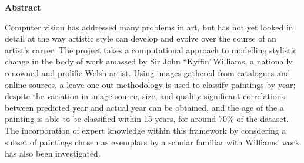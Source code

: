\thispagestyle{empty}

\begin{center}
    {\LARGE\bf Abstract}
\end{center}

Computer vision has addressed many problems in art, but has not yet looked in detail at the way 
artistic style can develop and evolve over the course of an artist’s career. The project takes 
a computational approach to modelling stylistic change in the body of work amassed by Sir John 
``Kyffin''Williams, a nationally renowned and prolific Welsh artist. Using images gathered 
from catalogues and online sources, a leave-one-out methodology is used to classify paintings by 
year; despite the variation in image source, size, and quality significant correlations between 
predicted year and actual year can be obtained, and the age of the a painting is able to be 
classified within 15 years, for around 70\% of the dataset. The incorporation of expert knowledge 
within this framework by consdering a subset of paintings chosen as exemplars by a scholar 
familiar with Williams' work has also been investigated.
